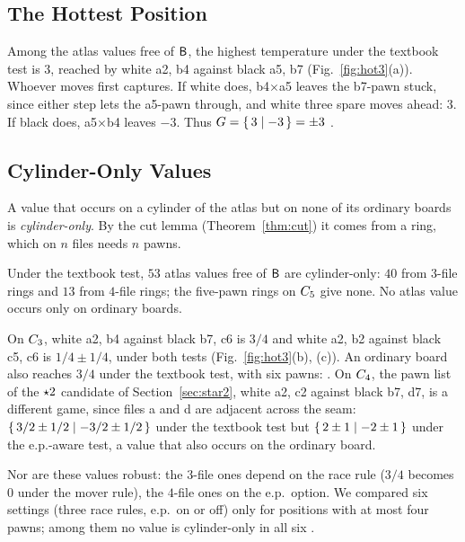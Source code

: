 \subsection{The Hottest Position}
Among the atlas values free of $\mathsf{B}$, the highest temperature under the textbook test is $3$, reached by white
a2, b4 against black a5, b7 (Fig.~\ref{fig:hot3}(a)). Whoever moves first captures. If white does,
b4$\times$a5 leaves the b7-pawn stuck, since either step lets the a5-pawn through, and white three spare
moves ahead: $3$. If black does, a5$\times$b4 leaves $-3$. Thus $G=\{\,3 \mid -3\,\}=\pm3$ .

\subsection{Cylinder-Only Values}
A value that occurs on a cylinder of the atlas but on none of its ordinary boards is \emph{cylinder-only}. By the cut lemma
(Theorem~\ref{thm:cut}) it comes from a ring, which on $n$ files needs $n$ pawns.

\begin{proposition}[\lab{C1}]\label{prop:cylonly}
Under the textbook test, $53$ atlas values free of $\mathsf{B}$ are cylinder-only: $40$ from $3$-file rings and
$13$ from $4$-file rings; the five-pawn rings on $C_{5}$ give none. No atlas value occurs only on ordinary boards.
\end{proposition}

On $C_{3}$, white a2, b4 against black b7, c6 is $3/4$ and white a2, b2 against black c5, c6 is
$1/4\pm1/4$, under both tests (Fig.~\ref{fig:hot3}(b), (c)). An ordinary board also reaches $3/4$ under the textbook test, with six pawns:  . On $C_{4}$, the pawn list of the $\mathord{\star2}$
candidate of Section~\ref{sec:star2}, white a2, c2 against black b7, d7, is a different game, since files a and
d are adjacent across the seam: $\{\,3/2\pm1/2 \mid -3/2\pm1/2\,\}$ under the textbook
test but $\{\,2\pm1 \mid -2\pm1\,\}$ under the e.p.-aware test, a value that also occurs on the ordinary board.

Nor are these values robust: the $3$-file ones depend on the race rule ($3/4$ becomes $0$ under the mover
rule), the $4$-file ones on the e.p.\ option. We compared six settings (three race rules, e.p.\ on or off) only for positions with at most
four pawns; among them no value is cylinder-only in all six .
